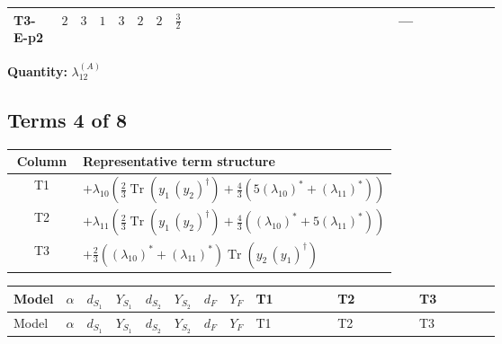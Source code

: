 \documentclass[8pt]{article}
\begin{document}
\begin{landscape}
\begin{longtable}{@{}llcccccc >{\raggedright\arraybackslash}p{0.21\linewidth} >{\raggedright\arraybackslash}p{0.21\linewidth} >{\raggedright\arraybackslash}p{0.21\linewidth}@{}}
\midrule
T3-E-p2 & $2$ & $3$ & $1$ & $3$ & $2$ & $2$ & $\frac{3}{2}$ & \scriptsize\adjustbox{max width=\linewidth}{$\begin{gathered} +2 {\lambda_{12}^{(A)}} {\lambda_{S_1}^{(1)}}\end{gathered}$} & \scriptsize\adjustbox{max width=\linewidth}{$\begin{gathered} +2 {\lambda_{12}^{(A)}} {\lambda_{S_2}^{(1)}}\end{gathered}$} & --- \\
\midrule
\bottomrule
\end{longtable}
\clearpage
\noindent\textbf{Quantity: }$\lambda_{12}^{(A)}$\par\smallskip
\subsection*{Terms 4 of 8}
\begin{center}
\begin{tabular}{@{}c >{\raggedright\arraybackslash}p{0.82\linewidth}@{}}
\toprule
Column & Representative term structure \\
\midrule
T1 & \(\displaystyle +{\lambda_{10}} \left(\frac{2}{3} \operatorname{Tr}\!\left({y_1}\,\left({y_2}\right)^{\dagger}\right)+\frac{4}{3} (5 \left({\lambda_{10}}\right)^{*}+\left({\lambda_{11}}\right)^{*})\right)\) \\
\midrule
T2 & \(\displaystyle +{\lambda_{11}} \left(\frac{2}{3} \operatorname{Tr}\!\left({y_1}\,\left({y_2}\right)^{\dagger}\right)+\frac{4}{3} (\left({\lambda_{10}}\right)^{*}+5 \left({\lambda_{11}}\right)^{*})\right)\) \\
\midrule
T3 & \(\displaystyle +\frac{2}{3} (\left({\lambda_{10}}\right)^{*}+\left({\lambda_{11}}\right)^{*}) \operatorname{Tr}\!\left({y_2}\,\left({y_1}\right)^{\dagger}\right)\) \\
\midrule
\bottomrule
\end{tabular}
\end{center}
\smallskip
\tiny
\begin{longtable}{@{}llcccccc >{\raggedright\arraybackslash}p{0.21\linewidth} >{\raggedright\arraybackslash}p{0.21\linewidth} >{\raggedright\arraybackslash}p{0.21\linewidth}@{}}
\toprule
Model & $\alpha$ & $d_{S_1}$ & $Y_{S_1}$ & $d_{S_2}$ & $Y_{S_2}$ & $d_F$ & $Y_F$ & T1 & T2 & T3 \\
\midrule
\endfirsthead
\toprule
Model & $\alpha$ & $d_{S_1}$ & $Y_{S_1}$ & $d_{S_2}$ & $Y_{S_2}$ & $d_F$ & $Y_F$ & T1 & T2 & T3 \\
\midrule

\end{longtable}
\end{landscape}
\end{document}
